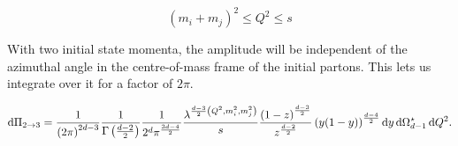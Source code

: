 \documentclass[../main.tex]{subfiles}
\begin{document}
\\
\begin{temporary}
  \[(m_i + m_j)^2 \leq Q^2 \leq s\]
\end{temporary}

With two initial state momenta, the amplitude will be independent of the
azimuthal angle in the centre-of-mass frame of the initial partons. This lets
us integrate over it for a factor of \(2\pi\).

\begin{equation}
  \mathrm{d}\Pi_{2\to 3} = \frac{1}{\left(2\pi\right)^{2d-3}}
  \frac{1}{\Gamma\left(\frac{d-2}{2}\right)}
  \frac{1}{2^d\pi^{\frac{3d-4}{2}}}
  \frac{\lambda^{\frac{d-3}{2}\left(Q^2,m_i^2,m_j^2\right)}}{s}
  \frac{\left(1-z\right)^{\frac{d-3}{2}}}{z^{\frac{d-2}{2}}}
  \left(y(1-y)\right)^{\frac{d-4}{2}} \mathrm{d}y\,
  \mathrm{d}\Omega_{d-1}^\star\,
  \mathrm{d}Q^2.
\end{equation}

\end{document}

